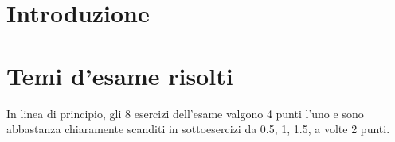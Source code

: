 \providecommand{\main}{.}



\def\reqFeaReg{Draw the feasible region in the $x_1-x_2$ axis and $f_1-f_2$.}
\newcommand{\reqParetReg}[1]{Determine the paretian region with the \textit{#1}.}
\newcommand{\reqPareStd}[1]{
	Consider the given problem of mathematical programming:
	\begin{enumerate}[a)]
		\item \reqFeaReg
		\item \reqParetReg{#1}
	\end{enumerate}
}

\newcommand{\fesReg}[1]{
	\fig{
		\texttt{[image: pareto/\#1/regx]}
		\caption{Feasible region in $x_1-x_2$}
	}{
		\texttt{[image: pareto/\#1/regf]}
		\caption{Feasible region in $f_1-f_2$}
	}[1]{\caption{Feasible regions}}
}




{\hypersetup{hidelinks}
	\tableofcontents  %
}

\chapter{Introduzione}



\clearpage

\clearpage

\clearpage

\clearpage

\clearpage

\clearpage

\clearpage


\appendix


\chapter{Temi d'esame risolti}

In linea di principio, gli 8 esercizi dell'esame valgono 4 punti l'uno e sono abbastanza chiaramente scanditi in sottoesercizi da 0.5, 1, 1.5, a volte 2 punti.


\clearpage

\clearpage

\clearpage

\clearpage




